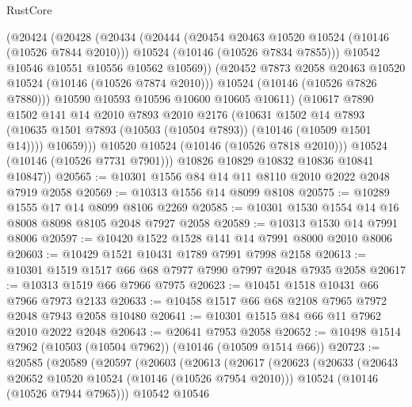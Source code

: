 \begin{lexlean}{RustCore}
\begin{coremodule}
                  (@20424
                    (@20428
                      (@20434
                        (@20444
                          (@20454 @20463 @10520 @10524 (@10146 (@10526 @7844 @2010)))
                          @10524
                          (@10146 (@10526 @7834 @7855)))
                        @10542
                        @10546
                        @10551
                        @10556
                        @10562
                        @10569))
                    (@20452 @7873 @2058 @20463 @10520 @10524 (@10146 (@10526 @7874 @2010)))
                    @10524
                    (@10146 (@10526 @7826 @7880)))
                  @10590
                  @10593
                  @10596
                  @10600
                  @10605
                  @10611)
                (@10617
                  @7890
                  @1502
                  @141
                  @14
                  @2010
                  @7893
                  @2010
                  @2176
                  (@10631
                    @1502
                    @14
                    @7893
                    (@10635 @1501 @7893 (@10503 (@10504 @7893)) (@10146 (@10509 @1501 @14))))
                  @10659)))
            @10520
            @10524
            (@10146 (@10526 @7818 @2010)))
          @10524
          (@10146 (@10526 @7731 @7901)))
        @10826
        @10829
        @10832
        @10836
        @10841
        @10847))
@20565 := @10301 @1556 @84 @14 @11 @8110 @2010 @2022 @2048 @7919 @2058
@20569 := @10313 @1556 @14 @8099 @8108
@20575 := @10289 @1555 @17 @14 @8099 @8106 @2269
@20585 := @10301 @1530 @1554 @14 @16 @8008 @8098 @8105 @2048 @7927 @2058
@20589 := @10313 @1530 @14 @7991 @8006
@20597 := @10420 @1522 @1528 @141 @14 @7991 @8000 @2010 @8006
@20603 := @10429 @1521 @10431 @1789 @7991 @7998 @2158
@20613 := @10301 @1519 @1517 @66 @68 @7977 @7990 @7997 @2048 @7935 @2058
@20617 := @10313 @1519 @66 @7966 @7975
@20623 := @10451 @1518 @10431 @66 @7966 @7973 @2133
@20633 := @10458 @1517 @66 @68 @2108 @7965 @7972 @2048 @7943 @2058 @10480
@20641 := @10301 @1515 @84 @66 @11 @7962 @2010 @2022 @2048
@20643 := @20641 @7953 @2058
@20652 := @10498 @1514 @7962 (@10503 (@10504 @7962)) (@10146 (@10509 @1514 @66))
@20723 := @20585
    (@20589
      (@20597
        (@20603
          (@20613
            (@20617
              (@20623
                (@20633
                  (@20643 @20652 @10520 @10524 (@10146 (@10526 @7954 @2010)))
                  @10524
                  (@10146 (@10526 @7944 @7965)))
                @10542
                @10546

\end{coremodule}
\end{lexlean}
